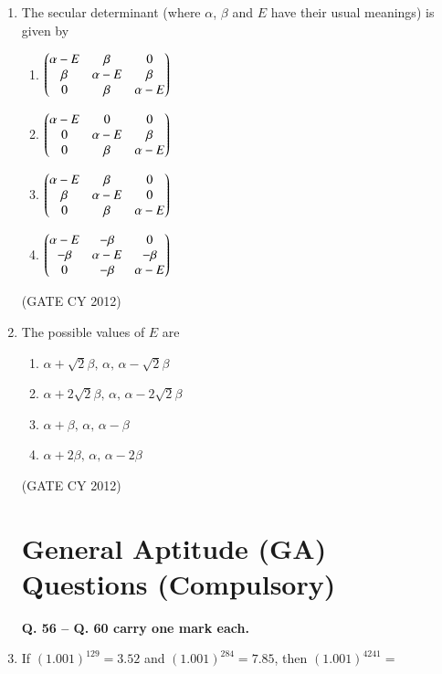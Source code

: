 \documentclass[12pt]{article}
\begin{document}
\begin{enumerate}
\item The secular determinant (where $\alpha$, $\beta$ and $E$ have their usual meanings) is given by

    \begin{multicols}{2}
    \begin{enumerate}
        \item $\begin{pmatrix}
    \alpha - E & \beta & 0 \\
    \beta & \alpha - E & \beta \\
    0 & \beta & \alpha - E
\end{pmatrix}$

\item $\begin{pmatrix}
    \alpha - E & 0 & 0 \\
    0 & \alpha - E & \beta \\
    0 & \beta & \alpha - E
\end{pmatrix}$

\item $\begin{pmatrix}
    \alpha - E & \beta & 0 \\
    \beta & \alpha - E & 0 \\
    0 & \beta & \alpha - E
\end{pmatrix}$

\item $\begin{pmatrix}
    \alpha - E & -\beta & 0 \\
    -\beta & \alpha - E & -\beta \\
    0 & -\beta & \alpha - E
\end{pmatrix}$

    \end{enumerate}
    \end{multicols}
    \hfill (GATE CY 2012)

\item The possible values of $E$ are
\begin{enumerate}
    \item $\alpha + \sqrt{2}\beta, \, \alpha, \, \alpha - \sqrt{2}\beta$
    \item $\alpha + 2\sqrt{2}\beta, \, \alpha, \, \alpha - 2\sqrt{2}\beta$
    \item $\alpha + \beta, \, \alpha, \, \alpha - \beta$
    \item $\alpha + 2\beta, \, \alpha, \, \alpha - 2\beta$
\end{enumerate}
\hfill (GATE CY 2012)

\section*{General Aptitude (GA) Questions (Compulsory)}

\textbf{Q. 56 -- Q. 60 carry one mark each.}


\item If $(1.001)^{129} = 3.52$ and $(1.001)^{284} = 7.85$, then $(1.001)^{4241} =$ 


\end{enumerate}
\end{document}
